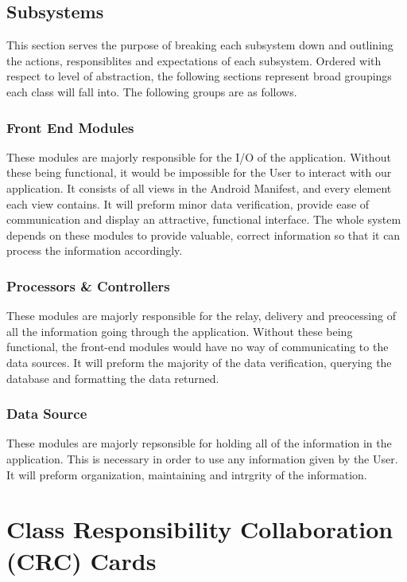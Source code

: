 \documentclass[]{article}
\begin{document}
\FloatBarrier

\subsection{Subsystems}
\label{sub:subsystems}
This section serves the purpose of breaking each subsystem down and outlining the actions, responsiblites and expectations of each subsystem. Ordered with respect to level of abstraction, the following sections represent broad groupings each class will fall into. The following groups are as follows.
\subsubsection{Front End Modules}
These modules are majorly responsible for the I/O of the application. Without these being functional, it would be impossible for the User to interact with our application. It consists of all views in the Android Manifest, and every element each view contains. It will preform minor data verification, provide ease of communication and display an attractive, functional interface. The whole system depends on these modules to provide valuable, correct information so that it can process the information accordingly.
\subsubsection{Processors \& Controllers}
These modules are majorly responsible for the relay, delivery and preocessing of all the information going through the application. Without these being functional, the front-end modules would have no way of communicating to the data sources. It will preform the majority of the data verification, querying the database and formatting the data returned.
\subsubsection{Data Source}
These modules are majorly repsonsible for holding all of the information in the application. This is necessary in order to use any information given by the User. It will preform organization, maintaining and intrgrity of the information.

\section{Class Responsibility Collaboration (CRC) Cards}
\label{sec:class_responsibility_collaboration_crc_cards}
\end{document}
